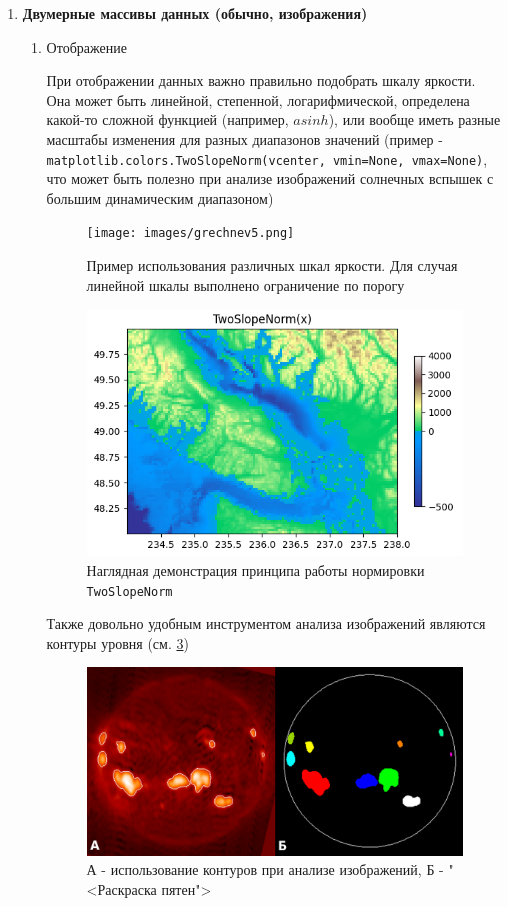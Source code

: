 \begin{enumerate}
	\item \textbf{Двумерные массивы данных (обычно, изображения)}

	\begin{enumerate}
		\item \textsf{Отображение}

		При отображении данных важно правильно подобрать шкалу яркости. Она может быть линейной, степенной, логарифмической, определена какой-то сложной функцией (например, $asinh$), или вообще иметь разные масштабы изменения для разных диапазонов значений (пример -\\ \texttt{matplotlib.colors.TwoSlopeNorm(vcenter, vmin=None, vmax=None)}, что может быть полезно при анализе изображений солнечных вспышек с большим динамическим диапазоном)

		\begin{figure}[h!]
			\centering
			\texttt{[image: images/grechnev5.png]}
			\caption{Пример использования различных шкал яркости. Для случая линейной шкалы выполнено ограничение по порогу}
			\label{grechnev5}
		\end{figure}

		\begin{figure}[h!]
			\centering
			\includegraphics[width=0.7\linewidth]{images/grechnev6.png}
			\caption{Наглядная демонстрация принципа работы нормировки \texttt{TwoSlopeNorm}}
			\label{grechnev6}
		\end{figure}

		Также довольно удобным инструментом анализа изображений являются контуры уровня (см. \cref{grechnev7})

		\begin{figure}[h!]
			\centering
			\includegraphics[width=0.7\linewidth]{images/grechnev7.png}
			\caption{А - использование контуров при анализе изображений, Б - "<Раскраска пятен">}
			\label{grechnev7}
		\end{figure}


\end{enumerate}
\end{enumerate}
